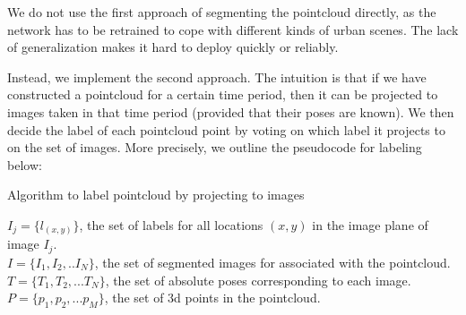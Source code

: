 We do not use the first approach of segmenting the pointcloud directly, as the network has to be retrained to cope with different kinds of urban scenes. The lack of generalization makes it hard to deploy quickly or reliably. 

Instead, we implement the second approach. The intuition is that if we have constructed a pointcloud for a certain time period, then it can be projected to images taken in that time period (provided that their poses are known). We then decide the label of each pointcloud point by voting on which label it projects to on the set of images. More precisely, we outline the pseudocode for labeling below:

\begin{algorithm}
\caption{Algorithm to label pointcloud by projecting to images}
\begin{algorithmic}
\REQUIRE $I_j = \{l_{(x,y)}\}$, the set of labels for all locations $(x,y)$ in the image plane of image $I_j$.
\\$I = \{I_1, I_2,..I_N\}$, the set of segmented images for associated with the pointcloud.
\\$T = \{T_1, T_2,...T_N\}$, the set of absolute poses corresponding to each image.
\\$P = \{p_1, p_2, ...p_M\}$, the set of 3d points in the pointcloud. 


\end{algorithmic}
\end{algorithm}




































































